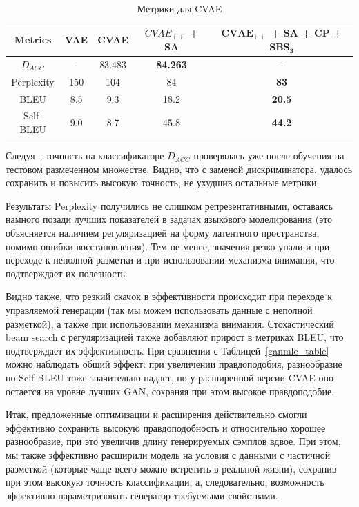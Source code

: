 \documentclass{spbau-diploma}
\begin{document}
\begin{table}[H]
\begin{tabular}{c | c c c c}
\toprule
Metrics & VAE & CVAE & $CVAE_{++}$ + SA & \textbf{$\boldsymbol{CVAE_{++}}$ + SA + CP + $\boldsymbol{SBS_3}$} \\
\midrule
$D_{ACC}$ & - & 83.483 & \textbf{84.263} & - \\
Perplexity & 150 & 104 & 84 & \textbf{83} \\
BLEU & 8.5 & 9.3 & 18.2 & \textbf{20.5} \\
Self-BLEU & 9.0 & 8.7 & 45.8 & \textbf{44.2} \\
\bottomrule
\end{tabular}
\caption{Метрики для CVAE}
\label{cvae_table}
\end{table}

Следуя~\cite{text_cvae}, точность на классификаторе $D_{ACC}$ проверялась уже 
после обучения на тестовом размеченном множестве. Видно, что с заменой 
дискриминатора, удалось сохранить и повысить высокую точность, не ухудшив 
остальные метрики.

Результаты Perplexity получились не слишком репрезентативными, оставаясь намного
позади лучших показателей в задачах языкового моделирования (это объясняется 
наличием регуляризацией на форму латентного пространства, помимо ошибки 
восстановления). Тем не менее, значения резко упали и при переходе к неполной
разметки и при использовании механизма внимания, что подтверждает их полезность.

Видно также, что резкий скачок в эффективности происходит при переходе к 
управляемой генерации (так мы можем использовать данные с неполной разметкой), а 
также при использовании механизма внимания. 
Стохастический beam search с регуляризацией
также добавляют прирост в метриках BLEU, что подтверждает их эффективность. При 
сравнении с Таблицей~\ref{ganmle_table} можно наблюдать общий эффект: при 
увеличении правдоподобия, разнообразие по Self-BLEU тоже значительно падает, 
но у расширенной версии CVAE оно остается на уровне лучших GAN, 
сохраняя при этом высокое правдоподобие.

Итак, предложенные оптимизации и расширения действительно смогли эффективно 
сохранить высокую правдоподобность и относительно хорошее разнообразие, при 
это увеличив длину генерируемых сэмплов вдвое. При этом, мы также эффективно 
расширили модель на условия с данными с частичной разметкой (которые чаще 
всего можно встретить в реальной жизни), сохранив при этом высокую точность 
классификации, а, следовательно, возможность эффективно параметризовать 
генератор требуемыми свойствами.
\end{document}
